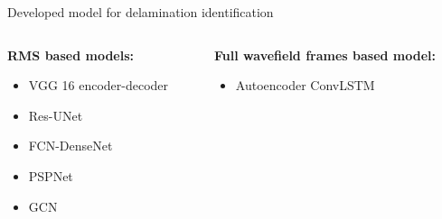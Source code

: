 \documentclass[10pt,aspectratio=169,dvipsnames]{beamer} %
\begin{document}
	\begin{frame}{Developed model for delamination identification}
		\begin{columns}[T]
			\begin{column}[t]{0.45\textwidth}
				\textbf{RMS based models: }
				\medskip
				\begin{itemize}
					\item VGG 16 encoder-decoder
					\item Res-UNet					
					\item FCN-DenseNet
					\item PSPNet
					\item GCN
				\end{itemize}				
			\end{column}
			\hfill
			\begin{column}[t]{.45\textwidth}
				\textbf{Full wavefield frames based model:}
				\begin{itemize}
					\item Autoencoder ConvLSTM
				\end{itemize}				
			\end{column}
		\end{columns}
	\end{frame}	
\end{document}
